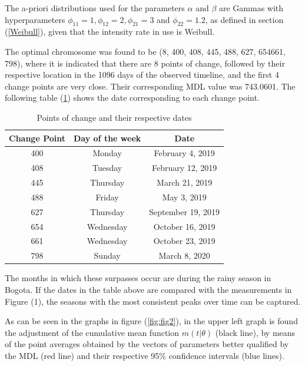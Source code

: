 \documentclass[APA,STIX1COL]{WileyNJD-v2}
\begin{document}
The a-priori distributions used for the parameters $\alpha$ and $\beta$ are Gammas with hyperparameters $\phi_{11}= 1, \phi_{12} = 2, \phi_{21} = 3$ and $\phi_{22}= 1.2$, as defined in section (\ref{Weibull}), given that the intensity rate in use is Weibull.

The optimal chromosome was found to be (8, 400, 408, 445, 488, 627, 654661, 798), where it is indicated that there are 8 points of change, followed by their respective location in the 1096 days of the observed timeline, and the first 4 change points are very close. Their corresponding MDL value was 743.0601. The following table (\ref{table:Points}) shows the date corresponding to each change point.


\begin{table}[h]
\begin{center}
\begin{tabular}{c|c|c}
\textbf{Change Point} & \textbf{Day of the week} & \textbf{Date}      \\ \hline
400                   & Monday                   & February 4, 2019   \\
408                   & Tuesday                  & February 12, 2019  \\
445                   & Thursday                 & March 21, 2019     \\
488                   & Friday                   & May 3, 2019        \\
627                   & Thursday                 & September 19, 2019 \\
654                   & Wednesday                & October 16, 2019   \\
661                   & Wednesday                & October 23, 2019   \\
798                   & Sunday                   & March 8, 2020     
\end{tabular}
\end{center}
\caption{Points of change and their respective dates}
\label{table:Points}
\end{table}


The months in which these surpasses occur are during the rainy season in Bogota. If the dates in the table above are compared with the measurements in Figure (1), the seasons with the most consistent peaks over time can be captured.

As can be seen in the graphs in figure (\ref{fig:fig2}), in the upper left graph is found the adjustment of the cumulative mean function $m(t|\theta)$ (black line), by means of the point averages obtained by the vectors of parameters better qualified by the MDL (red line) and their respective 95\% confidence intervals (blue lines).
\end{document}
